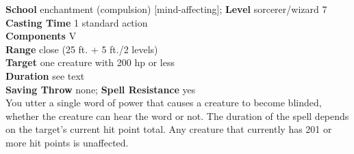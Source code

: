 \textbf{School} enchantment (compulsion) [mind-affecting]; \textbf{Level} sorcerer/wizard 7\\
\textbf{Casting Time} 1 standard action\\
\textbf{Components} V\\
\textbf{Range} close (25 ft. + 5 ft./2 levels)\\
\textbf{Target} one creature with 200 hp or less\\
\textbf{Duration} see text\\
\textbf{Saving Throw} none; \textbf{Spell Resistance} yes\\
You utter a single word of power that causes a creature to become blinded, whether the creature can hear the word or not. The duration of the spell depends on the target's current hit point total. Any creature that currently has 201 or more hit points is unaffected.\\
